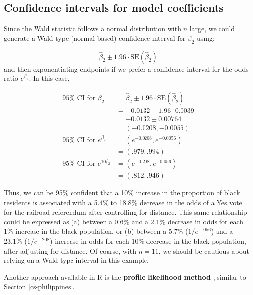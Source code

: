 \documentclass[
]{krantz}
\begin{document}
\hypertarget{confidence-intervals-for-model-coefficients}{%
\subsection{Confidence intervals for model coefficients}\label{confidence-intervals-for-model-coefficients}}

Since the Wald statistic follows a normal distribution with \(n\) large, we could generate a Wald-type (normal-based) confidence interval  for \(\beta_2\) using:

\[\hat\beta_2 \pm 1.96\cdot\textrm{SE}(\hat\beta_2)\]
and then exponentiating endpoints if we prefer a confidence interval for the odds ratio \(e^{\beta_2}\). In this case,

\begin{align*}
95\% \textrm{ CI for } \beta_2 &= \hat{\beta}_2 \pm 1.96 \cdot \textrm{SE}(\hat{\beta}_2) \\
                               &= -0.0132 \pm 1.96 \cdot 0.0039 \\
                               &= -0.0132 \pm 0.00764 \\
                               &= (-0.0208, -0.0056) \\
95\% \textrm{ CI for } e^{\beta_2} &= (e^{-0.0208}, e^{-0.0056}) \\
                                   &= (.979, .994) \\
95\% \textrm{ CI for } e^{10\beta_2} &= (e^{-0.208}, e^{-0.056}) \\
                                      &= (.812, .946)
\end{align*}

Thus, we can be 95\% confident that a 10\% increase in the proportion of black residents is associated with a 5.4\% to 18.8\% decrease in the odds of a Yes vote for the railroad referendum after controlling for distance. This same relationship could be expressed as (a) between a 0.6\% and a 2.1\% decrease in odds for each 1\% increase in the black population, or (b) between a 5.7\% (\(1/e^{-.056}\)) and a 23.1\% (\(1/e^{-.208}\)) increase in odds for each 10\% decrease in the black population, after adjusting for distance. Of course, with \(n=11\), we should be cautious about relying on a Wald-type interval in this example.

Another approach available in R is the \textbf{profile likelihood method} , similar to Section \ref{cs-philippines}.
\end{document}
